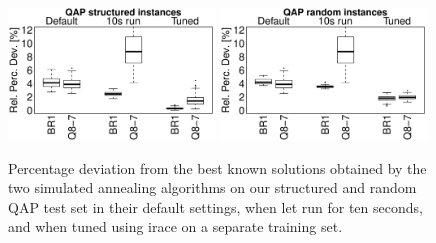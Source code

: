 \begin{figure}[tb]
  \begin{center}
    \includegraphics[width=0.49\textwidth]{Part 2 - Search-Based Optimization/Simulated Annealing/figures/es-bxp.pdf}
    \includegraphics[width=0.49\textwidth]{Part 2 - Search-Based Optimization/Simulated Annealing/figures/rr-bxp.pdf}
  \end{center}
  \caption{Percentage deviation from the best known solutions obtained
  by the two simulated annealing algorithms on our structured
  and random QAP test set in their default settings, when let run for ten seconds,
  and when tuned using irace on a separate training set.}
  \label{fig:resqap1}
\end{figure}

